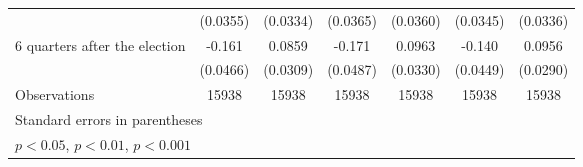 \begin{table}[htbp]
\begin{tabular}{l*{6}{c}}
                    &    (0.0355)         &    (0.0334)         &    (0.0365)         &    (0.0360)         &    (0.0345)         &    (0.0336)         \\
[1em]
 6 quarters after the election&      -0.161\sym{***}&      0.0859\sym{**} &      -0.171\sym{***}&      0.0963\sym{**} &      -0.140\sym{**} &      0.0956\sym{***}\\
                    &    (0.0466)         &    (0.0309)         &    (0.0487)         &    (0.0330)         &    (0.0449)         &    (0.0290)         \\
\hline
Observations        &       15938         &       15938         &       15938         &       15938         &       15938         &       15938         \\
\hline\hline
\multicolumn{7}{l}{\footnotesize Standard errors in parentheses}\\
\multicolumn{7}{l}{\footnotesize \sym{*} \(p<0.05\), \sym{**} \(p<0.01\), \sym{***} \(p<0.001\)}\\
\end{tabular}
\end{table}
